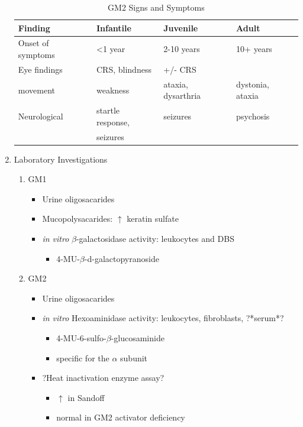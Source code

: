 \documentclass{scrartcl}
\begin{document}
\begin{enumerate}
\begin{table}[htbp]
\caption{\label{tab:org9dc8f6c}
GM2 Signs and Symptoms}
\centering
\begin{tabular}{llll}
Finding & Infantile & Juvenile & Adult\\
\hline
Onset of symptoms & <1 year & 2-10 years & 10+ years\\
Eye findings & CRS, blindness & +/- CRS & \\
movement & weakness & ataxia, dysarthria & dystonia, ataxia\\
Neurological & startle response, & seizures & psychosis\\
 & seizures &  & \\
\end{tabular}
\end{table}

\item Laboratory Investigations
\label{sec:org9f576ee}

\begin{enumerate}
\item GM1
\label{sec:org9e3754a}

\begin{itemize}
\item Urine oligosacarides
\item Mucopolysacarides: \(\uparrow\) keratin sulfate
\item \emph{in vitro} \(\beta\)-galactosidase activity: leukocytes and DBS
\begin{itemize}
\item 4-MU-\(\beta\)-d-galactopyranoside
\end{itemize}
\end{itemize}

\item GM2
\label{sec:org4402390}
\begin{itemize}
\item Urine oligosacarides
\item \emph{in vitro} Hexoaminidase activity: leukocytes, fibroblasts, ?*serum*?
\begin{itemize}
\item 4-MU-6-sulfo-\(\beta\)-glucosaminide
\item specific for the \(\alpha\) subunit
\end{itemize}
\item ?Heat inactivation enzyme assay?
\begin{itemize}
\item \(\uparrow\) in Sandoff
\item normal in GM2 activator deficiency
\end{itemize}


\end{itemize}
\end{enumerate}
\end{enumerate}
\end{document}

